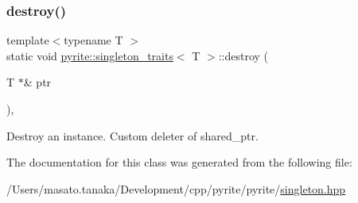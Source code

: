 \subsubsection{\texorpdfstring{destroy()}{destroy()}}
{\footnotesize\ttfamily template$<$typename T $>$ \\
static void \mbox{\hyperlink{classpyrite_1_1singleton__traits}{pyrite\+::singleton\+\_\+traits}}$<$ T $>$\+::destroy (\begin{DoxyParamCaption}\item[{T $\ast$\&}]{ptr }\end{DoxyParamCaption})\hspace{0.3cm}{\ttfamily [inline]}, {\ttfamily [static]}}

Destroy an instance. Custom deleter of shared\+\_\+ptr. 

The documentation for this class was generated from the following file\+:\begin{DoxyCompactItemize}
\item 
/\+Users/masato.\+tanaka/\+Development/cpp/pyrite/pyrite/\mbox{\hyperlink{singleton_8hpp}{singleton.\+hpp}}\end{DoxyCompactItemize}
